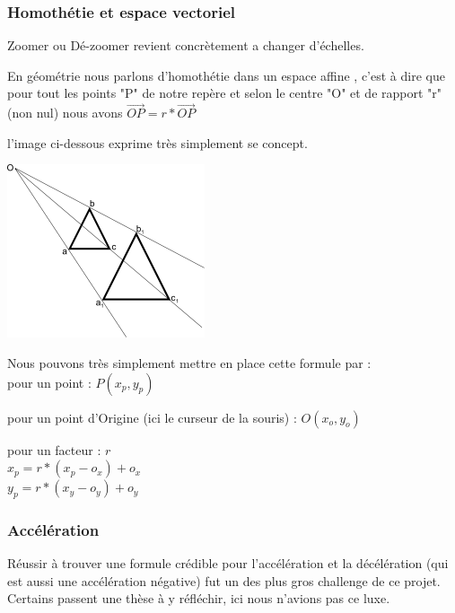 \documentclass[a4paper,11pt]{article}
\begin{document}
\subsubsection{Homothétie et espace vectoriel}

	Zoomer ou Dé-zoomer revient concrètement a changer d'échelles. 
	
	En géométrie nous parlons d'homothétie dans un espace affine%
, c'est à dire que pour tout les points "P" de notre repère et selon le centre "O" et de rapport "r" (non nul) nous avons $\vec{OP} = r*\vec{OP}$

l'image ci-dessous exprime très simplement se concept.\newline

\begin{center}
\includegraphics[scale=0.8]{Homothetie.png} \\
\end{center}

Nous pouvons très simplement mettre en place cette formule par : \\

pour un point : $ P(x_p, y_p) $

pour un point d'Origine (ici le curseur de la souris) : $ O(x_o, y_o) $

pour un facteur : $ r $\\

$ x_p = r * (x_p - o_x) + o_x $\\

$ y_p = r * (x_y - o_y) + o_y $\\

\subsubsection{Accélération}

Réussir à trouver une formule crédible pour l'accélération et la décélération (qui est aussi une accélération négative) fut un des plus gros challenge de ce projet. Certains passent une thèse à y réfléchir, ici nous n'avions pas ce luxe.
\end{document}
